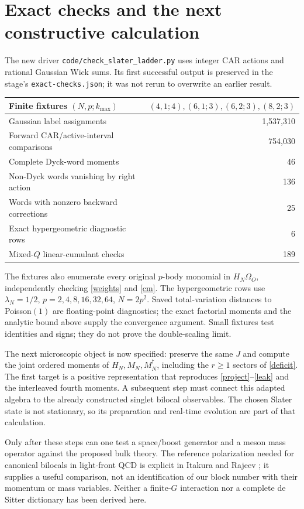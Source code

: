 \documentclass[11pt]{article}
\newcommand{\Om}{\Omega_O}
\begin{document}
\newpage
\section{Exact checks and the next constructive calculation}
The new driver \texttt{code/check\_slater\_ladder.py} uses integer CAR
actions and rational Gaussian Wick sums. Its first successful output
is preserved in the stage's \texttt{exact-checks.json}; it was not
rerun to overwrite an earlier result.
\begin{center}
\begin{tabular}{lr}
\toprule
Finite fixtures $(N,p;k_{\max})$ & $(4,1;4),(6,1;3),(6,2;3),(8,2;3)$\\
\midrule
Gaussian label assignments & 1,537,310\\
Forward CAR/active-interval comparisons & 754,030\\
Complete Dyck-word moments & 46\\
Non-Dyck words vanishing by right action & 136\\
Words with nonzero backward corrections & 25\\
Exact hypergeometric diagnostic rows & 6\\
Mixed-$Q$ linear-cumulant checks & 189\\
\bottomrule
\end{tabular}
\end{center}
The fixtures also enumerate every original $p$-body monomial in
$H_N\Om$, independently checking \eqref{weights} and \eqref{cm}.
The hypergeometric rows use $\lambda_N=1/2$, $p=2,4,8,16,32,64$,
$N=2p^2$. Saved total-variation distances to Poisson$(1)$ are
floating-point diagnostics; the exact factorial moments and the
analytic bound above supply the convergence argument. Small fixtures
test identities and signs; they do not prove the double-scaling limit.

The next microscopic object is now specified: preserve the same
$J$ and compute the joint ordered moments of $H_N,M_N,M_N^\dagger$,
including the $r\ge1$ sectors of \eqref{deficit}. The first target is a
positive representation that reproduces \eqref{project}--\eqref{leak}
and the interleaved fourth moments. A subsequent step must connect
this adapted algebra to the already constructed singlet bilocal
observables. The chosen Slater state is not stationary, so its
preparation and real-time evolution are part of that calculation.

Only after these steps can one test a space/boost generator and a
meson mass operator against the proposed bulk theory. The reference
polarization needed for canonical bilocals in light-front QCD is
explicit in Itakura and Rajeev \cite{Itakura,Rajeev}; it supplies a
useful comparison, not an identification of our block number with
their momentum or mass variables. Neither a finite-$G$ interaction
nor a complete de Sitter dictionary has been derived here.
\end{document}
